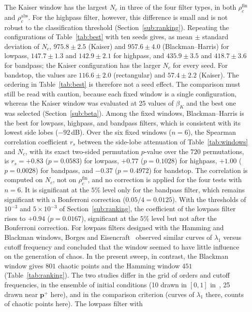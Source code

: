 \documentclass[journal]{IEEEtran}
\begin{document}
The Kaiser window has the largest $N_c$ in three of the four filter types,
in both $\rho_c^{\text{fin}}$ and $\rho_c^{\text{abs}}$. For the highpass filter,
however, this difference is small and is not robust to the classification
threshold (Section~\ref{sub:ranking}). Repeating the
configurations of Table~\ref{tab:best} with ten seeds gives, as mean $\pm$
standard deviation of $N_c$, $975.8\pm2.5$ (Kaiser) and $957.6\pm4.0$
(Blackman--Harris) for lowpass, $147.7\pm1.3$ and $142.9\pm2.1$ for highpass,
and $435.9\pm3.5$ and $418.7\pm3.6$ for bandpass; the Kaiser configuration
has the larger $N_c$ for every seed. For bandstop, the values are
$116.6\pm2.0$ (rectangular) and $57.4\pm2.2$ (Kaiser). The ordering in
Table~\ref{tab:best} is therefore not a seed effect. The comparison must still
be read with caution, because each fixed window is a single configuration,
whereas the Kaiser window was evaluated at 25 values of $\beta_K$ and the best
one was selected (Section~\ref{sub:beta}). Among the fixed
windows, Blackman--Harris is the best for lowpass, highpass, and bandpass
filters, which is consistent with its lowest side lobes ($-92$\,dB). Over
the six fixed windows ($n=6$), the Spearman correlation coefficient $r_s$
between the side-lobe attenuation of Table~\ref{tab:windows} and $N_c$, with
its exact two-sided permutation $p$-value over the $720$ permutations, is
$r_s=+0.83$ ($p=0.0583$) for lowpass, $+0.77$ ($p=0.1028$) for highpass,
$+1.00$ ($p=0.0028$) for bandpass, and $-0.37$ ($p=0.4972$) for bandstop.
The correlation is computed on $N_c$, not on $\rho_c^{\text{fin}}$, and no
correction is applied for the four tests with $n=6$. It is significant at the
$5\%$ level only for the bandpass filter, which remains significant with a
Bonferroni correction ($0.05/4=0.0125$). With the thresholds of $10^{-3}$ and
$5\times10^{-3}$ of Section~\ref{sub:ranking}, the coefficient of the lowpass
filter rises to $+0.94$ ($p=0.0167$), significant at the $5\%$ level but not after
the Bonferroni correction. For lowpass filters designed with the
Hamming and Blackman windows, Borges and Eisencraft~\cite{Borges2022sbrt}
observed similar curves of $\lambda_1$ versus cutoff frequency and concluded
that the window seemed to have little influence on the generation of chaos.
In the present sweep, in contrast, the Blackman window gives $801$ chaotic
points and the Hamming window $451$ (Table~\ref{tab:ranking}). The two studies
differ in the grid of orders and cutoff frequencies, in the ensemble of
initial conditions (10 drawn in $[0,1]$ in~\cite{Borges2022sbrt}, 25 drawn
near $\mathbf{p}^+$ here), and in the comparison criterion (curves of
$\lambda_1$ there, counts of chaotic points here). The lowpass filter with
\end{document}
